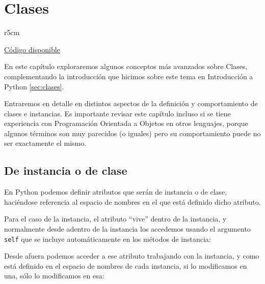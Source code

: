 

\chapter{Clases}\label{ch:clasesavanz}

\begin{wraptable}{r}{5cm}
\begin{modulesinfo}
\begin{center}
{\small
    \href{https://github.com/facundobatista/libro-pyciencia/tree/master/código/pyclases/}{Código disponible}
}
\end{center}
\end{modulesinfo}
\end{wraptable}

En este capítulo exploraremos algunos conceptos más avanzados sobre Clases, complementando la introducción que hicimos sobre este tema en Introducción a Python \ref{sec:clases}.

Entraremos en detalle en distintos aspectos de la definición y comportamiento de clases e instancias. Es importante revisar este capítulo incluso si se tiene experiencia con Programación Orientada a Objetos en otros lenguajes, porque algunos términos son muy parecidos (o iguales) pero su comportamiento puede no ser exactamente el mismo.


\section{De instancia o de clase}

En Python podemos definir atributos que serán de instancia o de clase, haciéndose referencia al espacio de nombres en el que está definido dicho atributo.

Para el caso de la instancia, el atributo ``vive'' dentro de la instancia, y normalmente desde adentro de la instancia los accedemos usando el argumento \texttt{self} que se incluye automáticamente en los métodos de instancia:


Desde afuera podemos acceder a ese atributo trabajando con la instancia, y como está definido en el espacio de nombres de cada instancia, si lo modificamos en una, sólo lo modificamos en esa:


